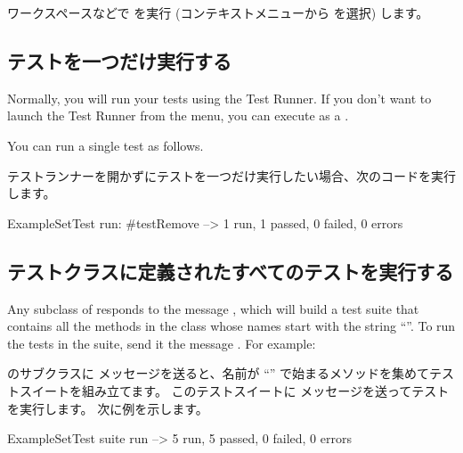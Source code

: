 \documentclass[a4paper,10pt,twoside]{book}
\begin{document}
{ワークスペースなどで  を実行 (コンテキストメニューから  を選択) します。



\subsection{テストを一つだけ実行する}

Normally, you will run your tests using the Test Runner.
If you don't want to launch the Test Runner from the  menu, you can execute  as a .

You can run a single test as follows.
\fi

テストランナーを開かずにテストを一つだけ実行したい場合、次のコードを実行します。

\begin{code}{}
ExampleSetTest run: #testRemove --> 1 run, 1 passed, 0 failed, 0 errors
\end{code}

\subsection{テストクラスに定義されたすべてのテストを実行する}

Any subclass of  responds to the message , which will build a test suite that contains all the
methods in the class whose names start with the string ``''.
To run the tests in the suite, send it the message .
For example:
\fi

 のサブクラスに  メッセージを送ると、名前が ``'' で始まるメソッドを集めてテストスイートを組み立てます。
このテストスイートに  メッセージを送ってテストを実行します。
次に例を示します。

\begin{code}{}
ExampleSetTest suite run --> 5 run, 5 passed, 0 failed, 0 errors
\end{code}

}
\end{document}
